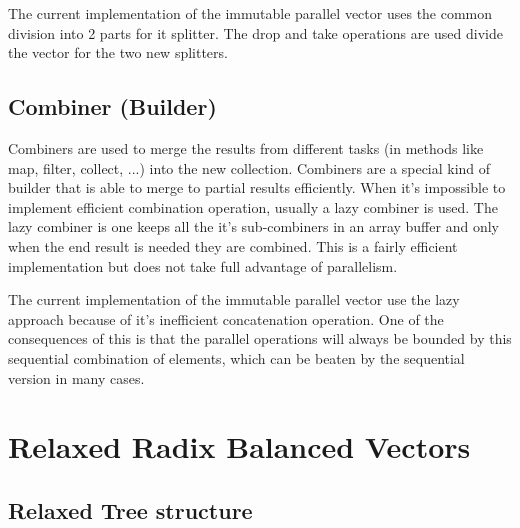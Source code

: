 The current implementation of the immutable parallel  vector \cite{scalaParVector211}  uses the common division into 2 parts for it splitter. The drop and take operations are used divide the vector for the two new splitters.


\subsection{Combiner (Builder)}
Combiners are used to merge the results from different tasks (in methods like map, filter, collect, ...) into the new collection. Combiners are a special kind of builder that is able to merge to partial results efficiently. When it's impossible to implement efficient combination operation, usually a lazy combiner is used. The lazy combiner is one keeps all the it's sub-combiners in an array buffer and only when the end result is needed they are combined. This is a fairly efficient implementation but does not take full advantage of parallelism. 

The current implementation of the immutable parallel vector \cite{scalaParVector211} use the lazy approach because of it's inefficient concatenation operation. One of the consequences of this is that the parallel operations will always be bounded by this sequential combination of elements, which can be beaten by the sequential version in many cases.
 


\section{Relaxed Radix Balanced Vectors}


\subsection{Relaxed Tree structure}

